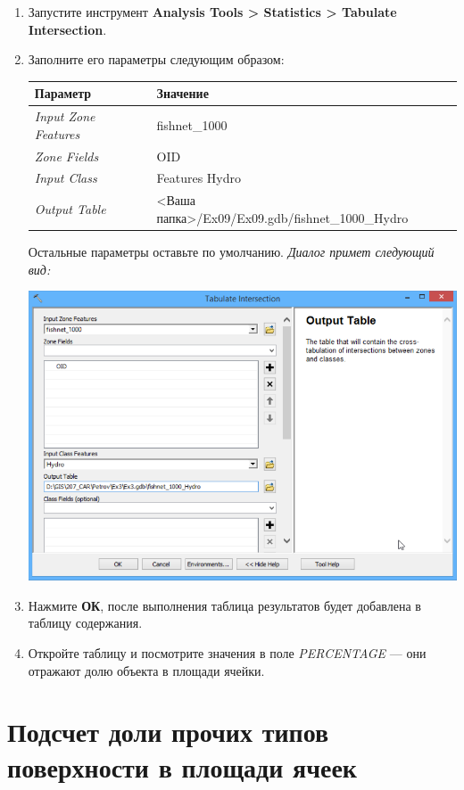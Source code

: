 \documentclass[]{book}
\theoremstyle{definition}
\theoremstyle{definition}
\theoremstyle{definition}
\theoremstyle{remark}
\begin{document}
\begin{enumerate}
\def\labelenumi{\arabic{enumi}.}
\item
  Запустите инструмент \textbf{Analysis Tools \textgreater{} Statistics
  \textgreater{} Tabulate Intersection}.
\item
  Заполните его параметры следующим образом:

  \begin{longtable}[]{@{}ll@{}}
  \toprule
  Параметр & Значение\tabularnewline
  \midrule
  \endhead
  \emph{Input Zone Features} & fishnet\_1000\tabularnewline
  \emph{Zone Fields} & OID\tabularnewline
  \emph{Input Class} & Features Hydro\tabularnewline
  \emph{Output Table} & \textless{}Ваша
  папка\textgreater{}/Ex09/Ex09.gdb/fishnet\_1000\_Hydro\tabularnewline
  \bottomrule
  \end{longtable}

  Остальные параметры оставьте по умолчанию. \emph{Диалог примет
  следующий вид:}

  \includegraphics{images/Ex09/image9.png}
\item
  Нажмите \textbf{ОК}, после выполнения таблица результатов будет
  добавлена в таблицу содержания.
\item
  Откройте таблицу и посмотрите значения в поле \emph{PERCENTAGE} ---
  они отражают долю объекта в площади ячейки.
\end{enumerate}

\hypertarget{land-cover-hydro-others}{%
\section{Подсчет доли прочих типов поверхности в площади
ячеек}\label{land-cover-hydro-others}}
\end{document}
